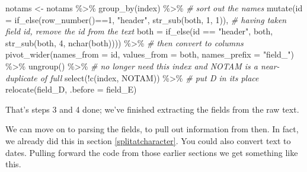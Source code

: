 \documentclass[
]{book}
\newenvironment{Shaded}{\begin{snugshade}}{\end{snugshade}}
\newcommand{\AttributeTok}[1]{\textcolor[rgb]{0.77,0.63,0.00}{#1}}
\newcommand{\CommentTok}[1]{\textcolor[rgb]{0.56,0.35,0.01}{\textit{#1}}}
\newcommand{\DecValTok}[1]{\textcolor[rgb]{0.00,0.00,0.81}{#1}}
\newcommand{\FunctionTok}[1]{\textcolor[rgb]{0.00,0.00,0.00}{#1}}
\newcommand{\NormalTok}[1]{#1}
\newcommand{\OtherTok}[1]{\textcolor[rgb]{0.56,0.35,0.01}{#1}}
\newcommand{\SpecialCharTok}[1]{\textcolor[rgb]{0.00,0.00,0.00}{#1}}
\newcommand{\StringTok}[1]{\textcolor[rgb]{0.31,0.60,0.02}{#1}}
\begin{document}
\begin{Shaded}
\begin{Highlighting}[]
\NormalTok{notams }\OtherTok{\textless{}{-}}\NormalTok{ notams }\SpecialCharTok{\%\textgreater{}\%} 
  \FunctionTok{group\_by}\NormalTok{(index) }\SpecialCharTok{\%\textgreater{}\%}
  \CommentTok{\# sort out the names}
  \FunctionTok{mutate}\NormalTok{(}\AttributeTok{id =} \FunctionTok{if\_else}\NormalTok{(}\FunctionTok{row\_number}\NormalTok{()}\SpecialCharTok{==}\DecValTok{1}\NormalTok{, }\StringTok{"header"}\NormalTok{, }\FunctionTok{str\_sub}\NormalTok{(both, }\DecValTok{1}\NormalTok{, }\DecValTok{1}\NormalTok{)),}
         \CommentTok{\# having taken field id, remove the id from the text}
         \AttributeTok{both =} \FunctionTok{if\_else}\NormalTok{(id }\SpecialCharTok{==} \StringTok{"header"}\NormalTok{, both,}
                        \FunctionTok{str\_sub}\NormalTok{(both, }\DecValTok{4}\NormalTok{, }\FunctionTok{nchar}\NormalTok{(both)))) }\SpecialCharTok{\%\textgreater{}\%}
  \CommentTok{\# then convert to columns}
  \FunctionTok{pivot\_wider}\NormalTok{(}\AttributeTok{names\_from =}\NormalTok{ id, }\AttributeTok{values\_from =}\NormalTok{ both, }\AttributeTok{names\_prefix =} \StringTok{"field\_"}\NormalTok{) }\SpecialCharTok{\%\textgreater{}\%}
  \FunctionTok{ungroup}\NormalTok{() }\SpecialCharTok{\%\textgreater{}\%}
  \CommentTok{\# no longer need this index and NOTAM is a near{-}duplicate of full}
  \FunctionTok{select}\NormalTok{(}\SpecialCharTok{!}\FunctionTok{c}\NormalTok{(index, NOTAM)) }\SpecialCharTok{\%\textgreater{}\%} 
  \CommentTok{\# put D in its place}
  \FunctionTok{relocate}\NormalTok{(field\_D, }\AttributeTok{.before =}\NormalTok{ field\_E)}
\end{Highlighting}
\end{Shaded}

That's steps 3 and 4 done; we've finished extracting the fields from the raw text.

We can move on to parsing the fields, to pull out information from then. In fact, we already did this in section \ref{splitatcharacter}. You could also convert text to dates. Pulling forward the code from those earlier sections we get something like this.
\end{document}

